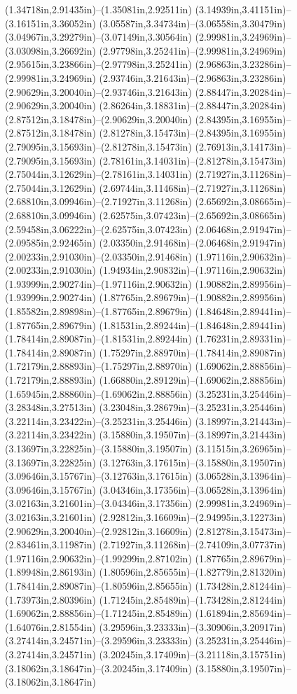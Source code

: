 (1.34718in,2.91435in)--(1.35081in,2.92511in) (3.14939in,3.41151in)--(3.16151in,3.36052in) (3.05587in,3.34734in)--(3.06558in,3.30479in) (3.04967in,3.29279in)--(3.07149in,3.30564in) (2.99981in,3.24969in)--(3.03098in,3.26692in) (2.97798in,3.25241in)--(2.99981in,3.24969in) (2.95615in,3.23866in)--(2.97798in,3.25241in) (2.96863in,3.23286in)--(2.99981in,3.24969in) (2.93746in,3.21643in)--(2.96863in,3.23286in) (2.90629in,3.20040in)--(2.93746in,3.21643in) (2.88447in,3.20284in)--(2.90629in,3.20040in) (2.86264in,3.18831in)--(2.88447in,3.20284in) (2.87512in,3.18478in)--(2.90629in,3.20040in) (2.84395in,3.16955in)--(2.87512in,3.18478in) (2.81278in,3.15473in)--(2.84395in,3.16955in) (2.79095in,3.15693in)--(2.81278in,3.15473in) (2.76913in,3.14173in)--(2.79095in,3.15693in) (2.78161in,3.14031in)--(2.81278in,3.15473in) (2.75044in,3.12629in)--(2.78161in,3.14031in) (2.71927in,3.11268in)--(2.75044in,3.12629in) (2.69744in,3.11468in)--(2.71927in,3.11268in) (2.68810in,3.09946in)--(2.71927in,3.11268in) (2.65692in,3.08665in)--(2.68810in,3.09946in) (2.62575in,3.07423in)--(2.65692in,3.08665in) (2.59458in,3.06222in)--(2.62575in,3.07423in) (2.06468in,2.91947in)--(2.09585in,2.92465in) (2.03350in,2.91468in)--(2.06468in,2.91947in) (2.00233in,2.91030in)--(2.03350in,2.91468in) (1.97116in,2.90632in)--(2.00233in,2.91030in) (1.94934in,2.90832in)--(1.97116in,2.90632in) (1.93999in,2.90274in)--(1.97116in,2.90632in) (1.90882in,2.89956in)--(1.93999in,2.90274in) (1.87765in,2.89679in)--(1.90882in,2.89956in) (1.85582in,2.89898in)--(1.87765in,2.89679in) (1.84648in,2.89441in)--(1.87765in,2.89679in) (1.81531in,2.89244in)--(1.84648in,2.89441in) (1.78414in,2.89087in)--(1.81531in,2.89244in) (1.76231in,2.89331in)--(1.78414in,2.89087in) (1.75297in,2.88970in)--(1.78414in,2.89087in) (1.72179in,2.88893in)--(1.75297in,2.88970in) (1.69062in,2.88856in)--(1.72179in,2.88893in) (1.66880in,2.89129in)--(1.69062in,2.88856in) (1.65945in,2.88860in)--(1.69062in,2.88856in) (3.25231in,3.25446in)--(3.28348in,3.27513in) (3.23048in,3.28679in)--(3.25231in,3.25446in) (3.22114in,3.23422in)--(3.25231in,3.25446in) (3.18997in,3.21443in)--(3.22114in,3.23422in) (3.15880in,3.19507in)--(3.18997in,3.21443in) (3.13697in,3.22825in)--(3.15880in,3.19507in) (3.11515in,3.26965in)--(3.13697in,3.22825in) (3.12763in,3.17615in)--(3.15880in,3.19507in) (3.09646in,3.15767in)--(3.12763in,3.17615in) (3.06528in,3.13964in)--(3.09646in,3.15767in) (3.04346in,3.17356in)--(3.06528in,3.13964in) (3.02163in,3.21601in)--(3.04346in,3.17356in) (2.99981in,3.24969in)--(3.02163in,3.21601in) (2.92812in,3.16609in)--(2.94995in,3.12273in) (2.90629in,3.20040in)--(2.92812in,3.16609in) (2.81278in,3.15473in)--(2.83461in,3.11987in) (2.71927in,3.11268in)--(2.74109in,3.07737in) (1.97116in,2.90632in)--(1.99299in,2.87102in) (1.87765in,2.89679in)--(1.89948in,2.86193in) (1.80596in,2.85655in)--(1.82779in,2.81320in) (1.78414in,2.89087in)--(1.80596in,2.85655in) (1.73428in,2.81244in)--(1.73973in,2.80396in) (1.71245in,2.85489in)--(1.73428in,2.81244in) (1.69062in,2.88856in)--(1.71245in,2.85489in) (1.61894in,2.85694in)--(1.64076in,2.81554in) (3.29596in,3.23333in)--(3.30906in,3.20917in) (3.27414in,3.24571in)--(3.29596in,3.23333in) (3.25231in,3.25446in)--(3.27414in,3.24571in) (3.20245in,3.17409in)--(3.21118in,3.15751in) (3.18062in,3.18647in)--(3.20245in,3.17409in) (3.15880in,3.19507in)--(3.18062in,3.18647in) 